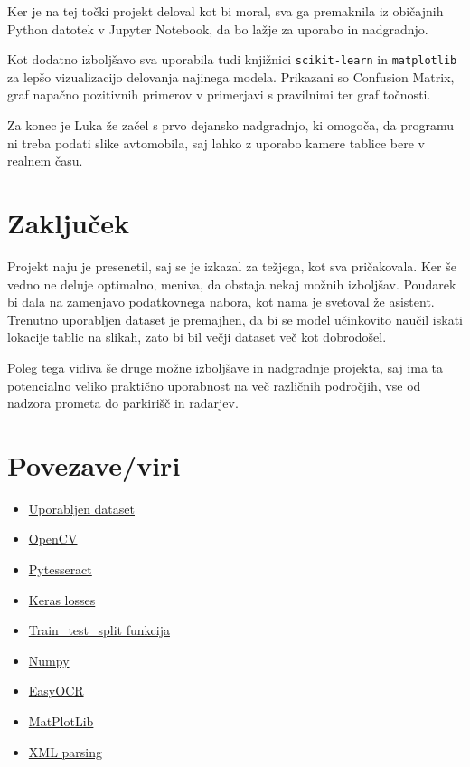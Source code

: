 \documentclass[a4paper,12pt]{article}
\begin{document}
Ker je na tej točki projekt deloval kot bi moral, sva ga premaknila iz običajnih Python datotek v Jupyter Notebook, da bo lažje za uporabo in nadgradnjo.

Kot dodatno izboljšavo sva uporabila tudi knjižnici \texttt{scikit-learn} in \texttt{matplotlib} za lepšo vizualizacijo delovanja najinega modela. Prikazani so Confusion Matrix, graf napačno pozitivnih primerov v primerjavi s pravilnimi ter graf točnosti.

Za konec je Luka že začel s prvo dejansko nadgradnjo, ki omogoča, da programu ni treba podati slike avtomobila, saj lahko z uporabo kamere tablice bere v realnem času.

\section*{Zaključek}
Projekt naju je presenetil, saj se je izkazal za težjega, kot sva pričakovala. Ker še vedno ne deluje optimalno, meniva, da obstaja nekaj možnih izboljšav. Poudarek bi dala na zamenjavo podatkovnega nabora, kot nama je svetoval že asistent. Trenutno uporabljen dataset je premajhen, da bi se model učinkovito naučil iskati lokacije tablic na slikah, zato bi bil večji dataset več kot dobrodošel.

Poleg tega vidiva še druge možne izboljšave in nadgradnje projekta, saj ima ta potencialno veliko praktično uporabnost na več različnih področjih, vse od nadzora prometa do parkirišč in radarjev.

\section*{Povezave/viri}
\begin{itemize}
    \item \href{https://www.kaggle.com/datasets/andrewmvd/car-plate-detection}{Uporabljen dataset}
    \item \href{https://opencv.org/}{OpenCV}
    \item \href{https://pypi.org/project/pytesseract/}{Pytesseract}
    \item \href{https://keras.io/api/keras\_cv/losses/}{Keras losses}
    \item \href{https://scikit-learn.org/stable/modules/generated/sklearn.model\_selection.train\_test\_split.html}{Train\_test\_split funkcija}
    \item \href{https://numpy.org/}{Numpy}
    \item \href{https://github.com/JaidedAI/EasyOCR}{EasyOCR}
    \item \href{https://matplotlib.org/}{MatPlotLib}
    \item \href{https://www.datacamp.com/tutorial/python-xml-elementtree}{XML parsing}
\end{itemize}
\end{document}
